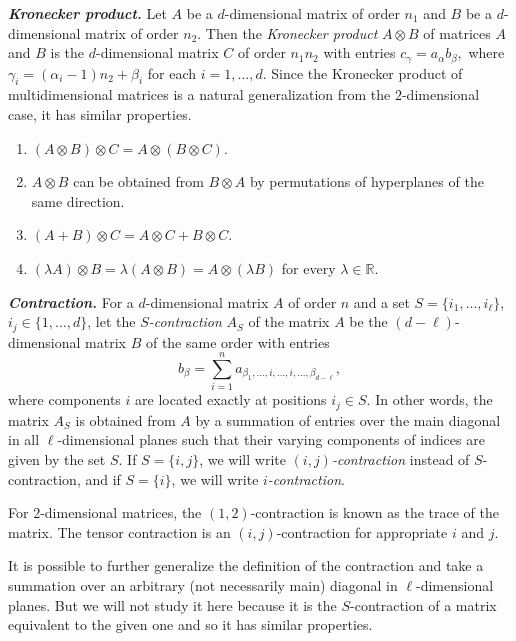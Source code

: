 \documentclass[a4paper]{article}
\begin{document}
\textbf{\textit{Kronecker product.}}   Let $A$ be a $d$-dimensional matrix of order $n_1$ and $B$ be a $d$-dimensional  matrix of order $n_2$.  Then the \textit{Kronecker product} $A\otimes B$ of matrices $A$ and $B$ is the $d$-dimensional matrix $C$ of order $n_1 n_2$ with entries $c_{\gamma} = a_\alpha b_\beta,$
where  $\gamma_i = (\alpha_i - 1) n_2 + \beta_i$ for each $i = 1, \ldots, d$. Since the Kronecker product of multidimensional matrices is a natural generalization from the $2$-dimensional case, it has similar properties. 


\begin{utv} \label{kroneckerprop}
\item 
\begin{enumerate}
\item $(A \otimes B) \otimes C = A \otimes (B \otimes C)$.
\item $A \otimes B$  can be obtained from $ B \otimes A$ by permutations of hyperplanes of the same direction.
\item $(A + B) \otimes C = A \otimes C + B \otimes C$.
\item $(\lambda A) \otimes B = \lambda (A \otimes B) = A \otimes (\lambda B)$ for every $\lambda \in \mathbb{R}$.
\end{enumerate}
\end{utv}


\textbf{\textit{Contraction.}}  For a $d$-dimensional matrix $A$ of order $n$ and a set $S = \{ i_1, \ldots, i_\ell \}$, $i_j \in \{ 1, \ldots, d\}$,  let the \textit{$S$-contraction} $A_S$ of the matrix $A$ be the $(d-\ell)$-dimensional matrix $B$ of the same order with entries 
$$b_\beta = \sum\limits_{i=1}^n  a_{\beta_1, \ldots,  i, \ldots, i, \ldots, \beta_{d-\ell} },$$
where  components $i$ are located exactly at positions $i_j \in S$.
In other words, the matrix $A_S$ is obtained from $A$ by a summation of entries over the main diagonal in all $\ell$-dimensional planes  such that their varying components of indices are given by the set $S$. If $S = \{ i,j\}$, we will write \textit{$(i,j)$-contraction} instead of $S$-contraction, and if $S = \{ i\}$, we will write \textit{$i$-contraction}. 

For $2$-dimensional matrices, the $(1,2)$-contraction  is  known as the trace of the matrix. The tensor contraction  is an $(i,j)$-contraction for appropriate $i$ and $j$.

It is possible to further generalize the definition of the contraction and take a summation over an arbitrary (not necessarily main) diagonal in $\ell$-dimensional planes. But we will not study it here because it is the $S$-contraction of a matrix equivalent to the given one and so  it has similar properties. 
\end{document}
